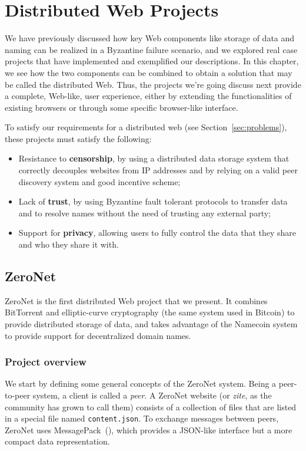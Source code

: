 \documentclass[mscthesis]{usiinfthesis}
\begin{document}
\chapter{Distributed Web Projects}\label{ch:projects}

We have previously discussed how key Web components like storage of data and naming can be realized in a Byzantine failure scenario, and we explored real case projects that have implemented and exemplified our descriptions. In this chapter, we see how the two components can be combined to obtain a solution that may be called the distributed Web.
Thus, the projects we're going discuss next provide a complete, Web-like, user experience, either by extending the functionalities of existing browsers or through some specific browser-like interface.

To satisfy our requirements for a distributed web (see Section~\ref{sec:problems}), these projects must satisfy the following:
\begin{itemize}
	\item Resistance to \textbf{censorship}, by using a distributed data storage system that correctly decouples websites from IP addresses and by relying on a valid peer discovery system and good incentive scheme;
	\item Lack of \textbf{trust}, by using Byzantine fault tolerant protocols to transfer data and to resolve names without the need of trusting any external party;
	\item Support for \textbf{privacy}, allowing users to fully control the data that they share and who they share it with.
\end{itemize}

\section{ZeroNet}\label{proj:zeronet}

ZeroNet is the first distributed Web project that we present. It combines BitTorrent and elliptic-curve cryptography (the same system used in Bitcoin) to provide distributed storage of data, and takes advantage of the Namecoin system to provide support for decentralized domain names.

\subsection{Project overview}

We start by defining some general concepts of the ZeroNet system. Being a peer-to-peer system, a client is called a \emph{peer}. A ZeroNet website (or \emph{zite}, as the community has grown to call them) consists of a collection of files that are listed in a special file named \texttt{content.json}. To exchange messages between peers, ZeroNet uses MessagePack~(\cite{website:msgpack}), which provides a JSON-like interface but a more compact data representation.
\end{document}
